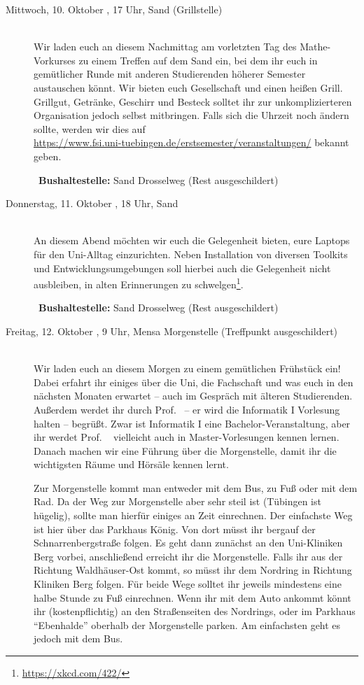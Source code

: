 \begin{description}
\item[Mittwoch, 10. Oktober \Jahr, 17 Uhr, Sand (Grillstelle)]\ \\
Wir laden euch an diesem Nachmittag am vorletzten Tag des Mathe-Vorkurses zu
einem Treffen auf dem Sand ein, bei dem ihr euch in gemütlicher Runde mit
anderen Studierenden höherer Semester austauschen könnt. Wir bieten euch
Gesellschaft und einen heißen Grill. Grillgut, Getränke, Geschirr und Besteck solltet ihr zur unkomplizierteren Organisation jedoch selbst mitbringen.
Falls sich die Uhrzeit noch ändern sollte, werden wir dies auf \\ \url{https://www.fsi.uni-tuebingen.de/erstsemester/veranstaltungen/} bekannt geben.

~\textbf{Bushaltestelle:} Sand Drosselweg (Rest ausgeschildert)

\item[Donnerstag, 11. Oktober \Jahr, 18 Uhr, Sand]\ \\
An diesem Abend möchten wir euch die Gelegenheit bieten, eure Laptops für den Uni-Alltag einzurichten. Neben Installation von diversen Toolkits und Entwicklungsumgebungen soll hierbei auch die Gelegenheit nicht ausbleiben, in alten Erinnerungen zu schwelgen\footnote{\url{https://xkcd.com/422/}}.

~\textbf{Bushaltestelle:} Sand Drosselweg (Rest ausgeschildert)


\item[Freitag, 12. Oktober \Jahr, 9 Uhr, Mensa Morgenstelle (Treffpunkt ausgeschildert)]\ \\
Wir laden euch an diesem Morgen zu einem gemütlichen Frühstück ein! Dabei erfahrt ihr einiges über die Uni, die Fachschaft und was euch in den nächsten Monaten erwartet -- auch im Gespräch mit älteren
Studierenden. Außerdem werdet ihr durch Prof. \Infoprof~-- er wird die Informatik I Vorlesung halten -- begrüßt.
\ifmaster Zwar ist Informatik I eine Bachelor-Veranstaltung, aber ihr werdet Prof. \Infoprof~ vielleicht auch in Master-Vorlesungen kennen lernen. \fi
Danach machen wir eine Führung über die Morgenstelle, damit ihr die wichtigsten Räume und Hörsäle kennen lernt.

Zur Morgenstelle kommt man entweder mit dem Bus, zu Fuß oder mit dem Rad. Da der Weg zur Morgenstelle aber sehr steil ist (Tübingen ist hügelig), sollte man hierfür einiges an Zeit einrechnen.
Der einfachste Weg ist hier über das Parkhaus König. Von dort müsst ihr bergauf der Schnarrenbergstraße folgen. Es geht dann zunächst an den Uni-Kliniken Berg vorbei, anschließend erreicht ihr die Morgenstelle. Falls ihr aus der Richtung Waldh\"auser-Ost kommt, so m\"usst ihr dem Nordring in Richtung Kliniken Berg folgen. Für beide Wege solltet ihr jeweils mindestens eine halbe Stunde zu Fuß einrechnen.
Wenn ihr mit dem Auto ankommt k\"onnt ihr (kostenpflichtig) an den Straßenseiten des Nordrings, oder im Parkhaus "`Ebenhalde"' oberhalb der Morgenstelle parken. Am einfachsten geht es jedoch mit dem Bus.


\end{description}
